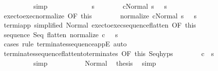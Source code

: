 \begin{isabellebody}
\ \ \ \ \ \ \ \ \isamarkupfalse%
\ simp\isanewline
\ \ \ \ \isamarkupfalse%
\isanewline
\ \ \ \ \ \ \isamarkupfalse%
\ s{\isacharprime}{\isacharprime}\isanewline
\ \ \ \ \ \ \isamarkupfalse%
\ {\isachardoublequoteopen}{\isasymGamma}{\isasymturnstile}{\isasymlangle}c{}{\isacharcomma}Normal\ s{\isacharprime}\ {\isasymrangle}\ {\isasymRightarrow}\ s{\isacharprime}{\isacharprime}{\isachardoublequoteclose}\isanewline
\ \ \ \ \ \ \isamarkupfalse%
\ exec{\isacharunderscore}to{\isacharunderscore}exec{\isacharunderscore}normalize\ {\isacharbrackleft}OF\ this{\isacharbrackright}\isanewline
\ \ \ \ \ \ \isamarkupfalse%
\ {\isachardoublequoteopen}{\isasymGamma}{\isasymturnstile}{\isasymlangle}normalize\ c{}{\isacharcomma}Normal\ s{\isacharprime}\ {\isasymrangle}\ {\isasymRightarrow}\ s{\isacharprime}{\isacharprime}{\isachardoublequoteclose}\ \isacommand{{\isachardot}}\isamarkupfalse%
\isanewline
\ \ \ \ \ \ \isamarkupfalse%
\ termi{\isacharunderscore}app\ {\isacharbrackleft}simplified\ Normal{\isacharbrackright}\ exec{\isacharunderscore}to{\isacharunderscore}exec{\isacharunderscore}sequence{\isacharunderscore}flatten\ {\isacharbrackleft}OF\ this{\isacharbrackright}\ \isanewline
\ \ \ \ \ \ \isamarkupfalse%
\ {\isachardoublequoteopen}{\isasymGamma}{\isasymturnstile}sequence\ Seq\ {\isacharparenleft}flatten\ {\isacharparenleft}normalize\ c{}{\isacharparenright}{\isacharparenright}\ \ {\isasymdown}\ s{\isacharprime}{\isacharprime}{\isachardoublequoteclose}\isanewline
\ \ \ \ \ \ \ \ \isamarkupfalse%
\ {\isacharparenleft}cases\ rule{\isacharcolon}\ terminates{\isacharunderscore}sequence{\isacharunderscore}appE{\isacharparenright}\ auto\isanewline
\ \ \ \ \ \ \isamarkupfalse%
\ terminates{\isacharunderscore}sequence{\isacharunderscore}flatten{\isacharunderscore}to{\isacharunderscore}terminates\ {\isacharbrackleft}OF\ this{\isacharbrackright}\ Seq{\isachardot}hyps\isanewline
\ \ \ \ \ \ \isamarkupfalse%
\ {\isachardoublequoteopen}{\isasymGamma}{\isasymturnstile}c{}\ {\isasymdown}\ s{\isacharprime}{\isacharprime}{\isachardoublequoteclose}\ \isanewline
\ \ \ \ \ \ \ \ \isamarkupfalse%
\ simp\isanewline
\ \ \ \ \isamarkupfalse%
\isanewline
\ \ \ \ \isamarkupfalse%
\ Normal\ \isamarkupfalse%
\ {\isacharquery}thesis\ \isamarkupfalse%
\ simp\isanewline
\ \ \isamarkupfalse%

\end{isabellebody}
